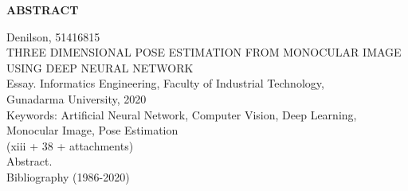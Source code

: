 \newpage %
\begin{center}
    \begin{large}\textbf{ABSTRACT}\end{large}
\end{center}

\vspace{5mm}

\noindent Denilson, 51416815 \\
THREE DIMENSIONAL POSE ESTIMATION FROM MONOCULAR IMAGE USING DEEP NEURAL NETWORK\\
Essay. Informatics Engineering, Faculty of Industrial Technology, \\
Gunadarma University, 2020\\
Keywords: Artificial Neural Network, Computer Vision, Deep Learning, Monocular Image, Pose Estimation\\
\noindent (xiii + 38 + attachments)\\

Abstract. \\

\noindent Bibliography (1986-2020)
